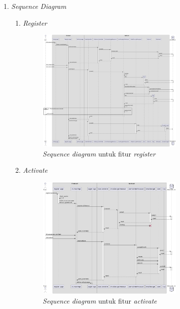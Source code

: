 \documentclass[a4paper]{article}
\begin{document}
\begin{enumerate}
    \item \textit{Sequence Diagram}
    \begin{enumerate}
        \item \textit{Register}\\
        \begin{figure}[h]
            \centering
            \includegraphics*[height=6cm]{diagram/sequence diagram/1. register/register.png}
            \caption{\textit{Sequence diagram} untuk fitur \textit{register}}
        \end{figure}
        \item \textit{Activate}\\
        \begin{figure}[h]
            \centering
            \includegraphics*[height=6cm]{diagram/sequence diagram/2. activate/activate user.png}
            \caption{\textit{Sequence diagram} untuk fitur \textit{activate}}
        \end{figure}
        \newpage


\end{enumerate}
\end{enumerate}
\end{document}
